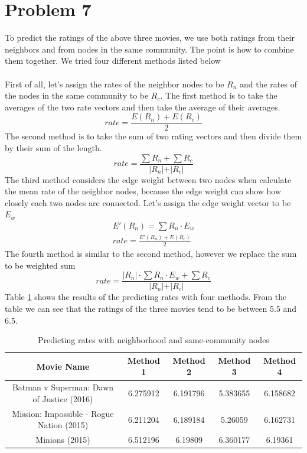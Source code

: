 \documentclass{article}
\begin{document}
\section{Problem 7}
To predict the ratings of the above three movies, we use both ratings from their neighbors and from nodes in the same community. The point is how to combine them together. We tried four different methods listed below\\
\\
First of all, let's assign the rates of the neighbor nodes to be $R_n$ and the rates of the nodes in the same community to be $R_c$. The first method is to take the averages of the two rate vectors and then take the average of their averages.
\begin{equation*}
rate = \frac{E(R_n) + E(R_c)}{2}
\end{equation*}
The second method is to take the sum of two rating vectors and then divide them by their sum of the length.
\begin{equation*}
rate = \frac{\sum{R_n}+\sum{R_c}}{\vert{R_n}\vert+\vert{R_c}\vert}
\end{equation*}
The third method considers the edge weight between two nodes when calculate the mean rate of the neighbor nodes, because the edge weight can show how closely each two nodes are connected. Let's assign the edge weight vector to be $E_w$
\begin{equation*}
\begin{aligned}
E'(R_n) = \sum{R_n\cdot E_w}\\
rate = \frac{E'(R_n) + E(R_c)}{2}
\end{aligned}
\end{equation*}
The fourth method is similar to the second method, however we replace the sum to be weighted sum
\begin{equation*}
rate = \frac{\vert{R_n}\vert \cdot \sum{R_n\cdot E_w}+\sum{R_c}}{\vert{R_n}\vert+\vert{R_c}\vert}
\end{equation*}
Table \ref{tb:7} shows the results of the predicting rates with four methods. From the table we can see that the ratings of the three movies tend to be between 5.5 and 6.5.
\begin {table}[htbp]
\caption{Predicting rates with neighborhood and same-community nodes}
\begin{adjustbox}{center}
\label{tb:7}
\begin{tabular}{|c|c|c|c|c|}
\hline
Movie Name&Method 1&Method 2&Method 3&Method 4\\
\hline
Batman v Superman: Dawn of Justice (2016)&6.275912&6.191796&5.383655&6.158682\\
\hline
Mission: Impossible - Rogue Nation (2015)&6.211204&6.189184&5.26059&6.162731\\
\hline
Minions (2015)&6.512196&6.19809&6.360177&6.19361\\
\hline
\end{tabular}
\end{adjustbox}
\end{table}
\end{document}
